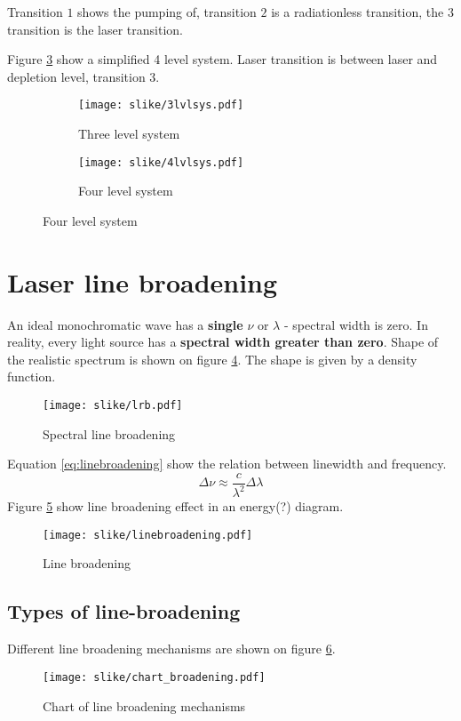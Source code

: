 Transition $1$ shows the pumping of, transition $2$ is a radiationless transition, the $3$ transition is the laser transition.

Figure \ref{fig:4lvlsys} show a simplified 4 level system. Laser transition is between laser and depletion level, transition $3$. 

\begin{figure}[h!]
    \centering
    \begin{subfigure}{0.45\textwidth}
        \texttt{[image: slike/3lvlsys.pdf]}
        \caption{Three level system}
        \label{fig:3lvlsys}
    \end{subfigure}
    \begin{subfigure}{0.45\textwidth}
        \texttt{[image: slike/4lvlsys.pdf]}
        \caption{Four level system}
        \label{fig:4lvlsys}
    \end{subfigure}

\end{figure}

\section{Laser line broadening}

An ideal monochromatic wave has a \textbf{single } $\nu$ or $\lambda$ - spectral width is zero. 
In reality, every light source has a \textbf{spectral width greater than zero}.
Shape of the realistic spectrum is shown on figure \ref{fig:bls}. The shape is given by a density function.

\begin{figure}[h!]
    \centering
    \texttt{[image: slike/lrb.pdf]}
    \caption{Spectral line broadening}
    \label{fig:bls}
\end{figure}

Equation \ref{eq:linebroadening} show the relation between linewidth and frequency.
\begin{equation}
    \Delta \nu \approx \frac{c}{\lambda^2} \Delta \lambda
    \label{eq:linebroadening}
\end{equation}
Figure \ref{fig:lb} show line broadening effect in an energy(?) diagram.
\begin{figure}[h!]
    \centering
    \texttt{[image: slike/linebroadening.pdf]}
    \caption{Line broadening}
    \label{fig:lb}
\end{figure}

\subsection{Types of line-broadening}
Different line broadening mechanisms are shown on figure \ref{fig:chart_broad}.
\begin{figure}[h!]
    \centering
    \texttt{[image: slike/chart\_broadening.pdf]}
    \caption{Chart of line broadening mechanisms}
    \label{fig:chart_broad}
\end{figure}

